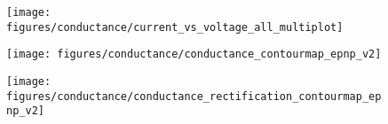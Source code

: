 \begin{figure*}[htbp]
  \centering
  \begin{subfigure}[t]{4.5cm}
    \centering
    \caption{}\vspace{-3mm}\label{fig:current-voltage_curves}
    \texttt{[image: figures/conductance/current\_vs\_voltage\_all\_multiplot]}
  \end{subfigure}
  \begin{minipage}[t]{8cm}
    \begin{subfigure}[t]{8cm}
      \centering
      \caption{}\vspace{-5mm}\label{fig:conductance_contourmap_epnp}
      \texttt{[image: figures/conductance/conductance\_contourmap\_epnp\_v2]}
    \end{subfigure}
    \begin{subfigure}[t]{8cm}
      \centering
      \caption{}\vspace{-5mm}\label{fig:conductance_rectification_contourmap_epnp}
      \texttt{[image: figures/conductance/conductance\_rectification\_contourmap\_epnp\_v2]}
    \end{subfigure} 
  \end{minipage}


\end{figure*}
